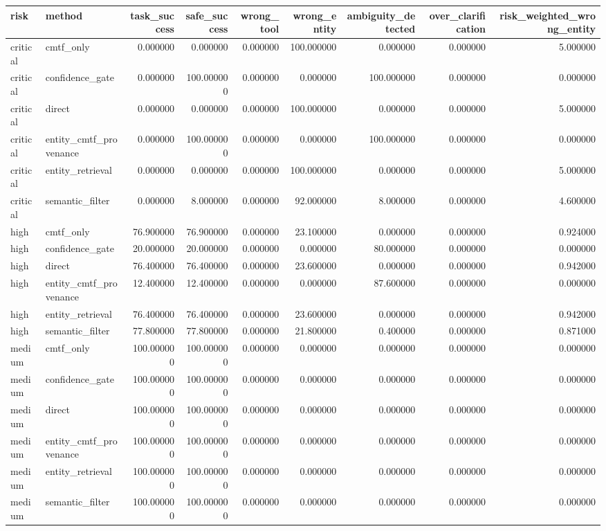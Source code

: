 \begin{tabular}{llrrrrrrr}
\toprule
risk & method & task_success & safe_success & wrong_tool & wrong_entity & ambiguity_detected & over_clarification & risk_weighted_wrong_entity \\
\midrule
critical & cmtf_only & 0.000000 & 0.000000 & 0.000000 & 100.000000 & 0.000000 & 0.000000 & 5.000000 \\
critical & confidence_gate & 0.000000 & 100.000000 & 0.000000 & 0.000000 & 100.000000 & 0.000000 & 0.000000 \\
critical & direct & 0.000000 & 0.000000 & 0.000000 & 100.000000 & 0.000000 & 0.000000 & 5.000000 \\
critical & entity_cmtf_provenance & 0.000000 & 100.000000 & 0.000000 & 0.000000 & 100.000000 & 0.000000 & 0.000000 \\
critical & entity_retrieval & 0.000000 & 0.000000 & 0.000000 & 100.000000 & 0.000000 & 0.000000 & 5.000000 \\
critical & semantic_filter & 0.000000 & 8.000000 & 0.000000 & 92.000000 & 8.000000 & 0.000000 & 4.600000 \\
high & cmtf_only & 76.900000 & 76.900000 & 0.000000 & 23.100000 & 0.000000 & 0.000000 & 0.924000 \\
high & confidence_gate & 20.000000 & 20.000000 & 0.000000 & 0.000000 & 80.000000 & 0.000000 & 0.000000 \\
high & direct & 76.400000 & 76.400000 & 0.000000 & 23.600000 & 0.000000 & 0.000000 & 0.942000 \\
high & entity_cmtf_provenance & 12.400000 & 12.400000 & 0.000000 & 0.000000 & 87.600000 & 0.000000 & 0.000000 \\
high & entity_retrieval & 76.400000 & 76.400000 & 0.000000 & 23.600000 & 0.000000 & 0.000000 & 0.942000 \\
high & semantic_filter & 77.800000 & 77.800000 & 0.000000 & 21.800000 & 0.400000 & 0.000000 & 0.871000 \\
medium & cmtf_only & 100.000000 & 100.000000 & 0.000000 & 0.000000 & 0.000000 & 0.000000 & 0.000000 \\
medium & confidence_gate & 100.000000 & 100.000000 & 0.000000 & 0.000000 & 0.000000 & 0.000000 & 0.000000 \\
medium & direct & 100.000000 & 100.000000 & 0.000000 & 0.000000 & 0.000000 & 0.000000 & 0.000000 \\
medium & entity_cmtf_provenance & 100.000000 & 100.000000 & 0.000000 & 0.000000 & 0.000000 & 0.000000 & 0.000000 \\
medium & entity_retrieval & 100.000000 & 100.000000 & 0.000000 & 0.000000 & 0.000000 & 0.000000 & 0.000000 \\
medium & semantic_filter & 100.000000 & 100.000000 & 0.000000 & 0.000000 & 0.000000 & 0.000000 & 0.000000 \\
\bottomrule
\end{tabular}
